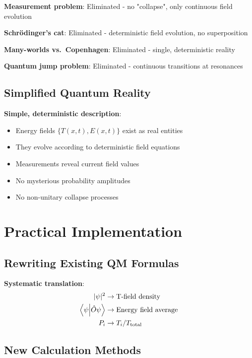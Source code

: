 \documentclass[12pt,a4paper]{article}
\newcommand{\Tfield}{T(x,t)}
\newcommand{\Efield}{E(x,t)}
\begin{document}
	\textbf{Measurement problem}: Eliminated - no "collapse", only continuous field evolution
	
	\textbf{Schrödinger's cat}: Eliminated - deterministic field evolution, no superposition
	
	\textbf{Many-worlds vs.~Copenhagen}: Eliminated - single, deterministic reality
	
	\textbf{Quantum jump problem}: Eliminated - continuous transitions at resonances
	
	\subsection{Simplified Quantum Reality}
	
	\begin{tcolorbox}[colback=green!5!white,colframe=green!75!black,title=T0 Quantum Reality]
		\textbf{Simple, deterministic description}:
		\begin{itemize}
			\item Energy fields $\{\Tfield, \Efield\}$ exist as real entities
			\item They evolve according to deterministic field equations
			\item Measurements reveal current field values
			\item No mysterious probability amplitudes
			\item No non-unitary collapse processes
		\end{itemize}
	\end{tcolorbox}
	
	\section{Practical Implementation}
	
	\subsection{Rewriting Existing QM Formulas}
	
	\textbf{Systematic translation}:
	\begin{align}
		|\psi|^2 &\to \text{T-field density} \\
		\braket{\psi}{\hat{O} \psi} &\to \text{Energy field average} \\
		P_i &\to T_i/T_{\text{total}}
	\end{align}
	
	\subsection{New Calculation Methods}
	
\end{document}
